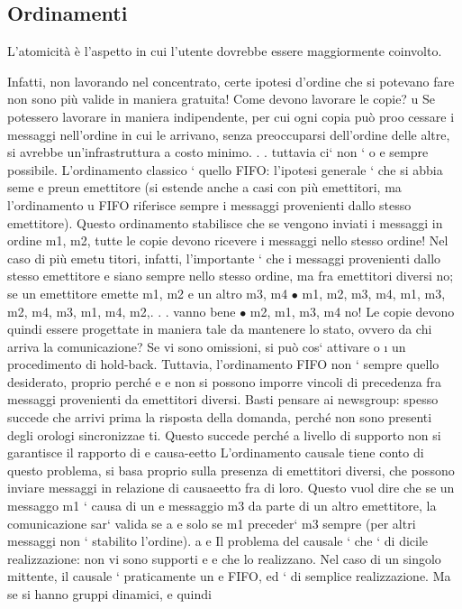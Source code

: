 \documentclass[a4paper,12pt]{article}
\begin{document}
\subsection{Ordinamenti}
L'atomicità è l'aspetto in cui l'utente dovrebbe essere maggiormente coinvolto.

Infatti, non lavorando nel concentrato, certe ipotesi d'ordine che si potevano
fare non sono più valide in maniera gratuita! Come devono lavorare le copie?
u
Se potessero lavorare in maniera indipendente, per cui ogni copia può proo
cessare i messaggi nell'ordine in cui le arrivano, senza preoccuparsi dell'ordine
delle altre, si avrebbe un'infrastruttura a costo minimo. . . tuttavia ci` non `
o
e
sempre possibile.
L'ordinamento classico ` quello FIFO: l'ipotesi generale ` che si abbia seme
e
preun emettitore (si estende anche a casi con più emettitori, ma l'ordinamento
u
FIFO riferisce sempre i messaggi provenienti dallo stesso emettitore). Questo
ordinamento stabilisce che se vengono inviati i messaggi in ordine m1, m2, tutte
le copie devono ricevere i messaggi nello stesso ordine! Nel caso di più emetu
titori, infatti, l'importante ` che i messaggi provenienti dallo stesso emettitore
e
siano sempre nello stesso ordine, ma fra emettitori diversi no; se un emettitore
emette m1, m2 e un altro m3, m4
$\bullet$ m1, m2, m3, m4, m1, m3, m2, m4, m3, m1, m4, m2,. . . vanno bene
$\bullet$ m2, m1, m3, m4 no!
Le copie devono quindi essere progettate in maniera tale da mantenere lo stato,
ovvero da chi arriva la comunicazione? Se vi sono omissioni, si può cos` attivare
o
\i{}
un procedimento di hold-back.
Tuttavia, l'ordinamento FIFO non ` sempre quello desiderato, proprio perché
e
e
non si possono imporre vincoli di precedenza fra messaggi provenienti da emettitori diversi. Basti pensare ai newsgroup:
spesso succede che arrivi prima
la risposta della domanda, perché non sono presenti degli orologi sincronizzae
ti. Questo succede perché a livello di supporto non si garantisce il rapporto di
e
causa-eetto
L'ordinamento causale tiene conto di questo problema, si basa proprio sulla
presenza di emettitori diversi, che possono inviare messaggi in relazione di causaeetto fra di loro. Questo vuol dire
che se un messaggo m1 ` causa di un
e
messaggio m3 da parte di un altro emettitore, la comunicazione sar` valida se
a
e solo se m1 preceder` m3 sempre (per altri messaggi non ` stabilito l'ordine).
a
e
Il problema del causale ` che ` di dicile realizzazione: non vi sono supporti
e
e
che lo realizzano. Nel caso di un singolo mittente, il causale ` praticamente un
e
FIFO, ed ` di semplice realizzazione. Ma se si hanno gruppi dinamici, e quindi
\end{document}

